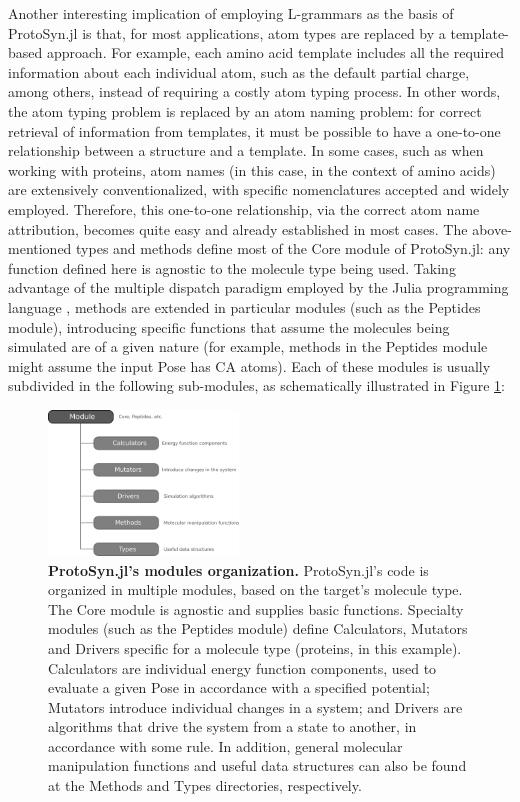 \documentclass{juliacon}
\begin{document}
Another interesting implication of employing L-grammars as the basis of ProtoSyn.jl is that, for most applications, atom types are replaced by a template-based approach. For example, each amino acid template includes all the required information about each individual atom, such as the default partial charge, among others, instead of requiring a costly atom typing process. In other words, the atom typing problem is replaced by an atom naming problem: for correct retrieval of information from templates, it must be possible to have a one-to-one relationship between a structure and a template. In some cases, such as when working with proteins, atom names (in this case, in the context of amino acids) are extensively conventionalized, with specific nomenclatures accepted and widely employed. Therefore, this one-to-one relationship, via the correct atom name attribution, becomes quite easy and already established in most cases.\vspace{5mm}
The above-mentioned types and methods define most of the Core module of ProtoSyn.jl: any function defined here is agnostic to the molecule type being used. Taking advantage of the multiple dispatch paradigm employed by the Julia programming language \cite{Zappa2018}, methods are extended in particular modules (such as the Peptides module), introducing specific functions that assume the molecules being simulated are of a given nature (for example, methods in the Peptides module might assume the input Pose has CA atoms). Each of these modules is usually subdivided in the following sub-modules, as schematically illustrated in Figure \ref{fig:ProtoSynArticle-IM3}:

\begin{figure}[h]
\centering
\includegraphics[width=0.45\textwidth]{ProtoSynArticle-IM3}
\caption{\textbf{ProtoSyn.jl’s modules organization.} ProtoSyn.jl’s code is organized in multiple modules, based on the target’s molecule type. The Core module is agnostic and supplies basic functions. Specialty modules (such as the Peptides module) define Calculators, Mutators and Drivers specific for a molecule type (proteins, in this example). Calculators are individual energy function components, used to evaluate a given Pose in accordance with a specified potential; Mutators introduce individual changes in a system; and Drivers are algorithms that drive the system from a state to another, in accordance with some rule. In addition, general molecular manipulation functions and useful data structures can also be found at the Methods and Types directories, respectively.}
\label{fig:ProtoSynArticle-IM3}
\end{figure}
\end{document}

